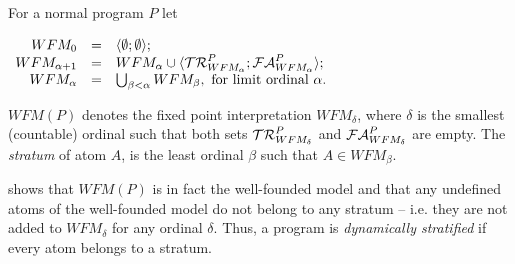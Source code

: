 \begin{definition}
\label{def:IFP}
For a normal program $P$ let 

\begin{center}
$  \begin{array}{rcl}
          WFM_0 & = & \langle \emptyset ; \emptyset \rangle;      \\
 WFM_{\alpha+1} & = &       WFM_{\alpha} \cup
                                \langle \kcaltrue^P_{WFM_\alpha};\calfalse^P_{WFM_\alpha} \rangle; \\
     WFM_\alpha & = & \bigcup_{\beta < \alpha} WFM_\beta, \mbox{ for limit ordinal }\alpha.
  \end{array}
$
\end{center}

\noindent
  $WFM(P)$ denotes the fixed point interpretation $WFM_\delta$,
  where $\delta$ is the smallest (countable) ordinal such that both
  sets $\mathcal{TR}^P_{WFM_\delta}$ and $\calfalse^P_{WFM_\delta}$ are empty.
The {\em stratum} of atom $A$, is the least ordinal $\beta$ such that
   $A \in WFM_{\beta}$.
\end{definition}
%
\cite{Przy89d} shows that %
$WFM(P)$ is in fact the well-founded model and that any undefined
atoms of the well-founded model do not belong to any stratum --
i.e. they are not added to $WFM_{\delta}$ for any ordinal
$\delta$. Thus, a program is \emph{dynamically stratified} if every
atom belongs to a stratum.


%

